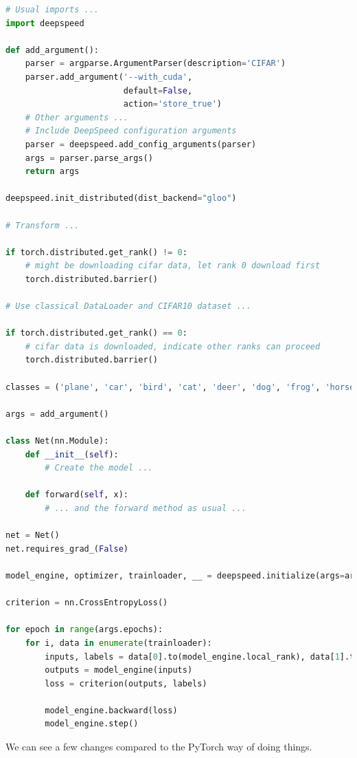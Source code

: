 \documentclass{article}
\begin{document}
\begin{lstlisting}[language=Python]
# Usual imports ...
import deepspeed

def add_argument():
    parser = argparse.ArgumentParser(description='CIFAR')
    parser.add_argument('--with_cuda',
                        default=False,
                        action='store_true')
    # Other arguments ...
    # Include DeepSpeed configuration arguments
    parser = deepspeed.add_config_arguments(parser)
    args = parser.parse_args()
    return args

deepspeed.init_distributed(dist_backend="gloo")

# Transform ...

if torch.distributed.get_rank() != 0:
    # might be downloading cifar data, let rank 0 download first
    torch.distributed.barrier()

# Use classical DataLoader and CIFAR10 dataset ...

if torch.distributed.get_rank() == 0:
    # cifar data is downloaded, indicate other ranks can proceed
    torch.distributed.barrier()

classes = ('plane', 'car', 'bird', 'cat', 'deer', 'dog', 'frog', 'horse', 'ship', 'truck')

args = add_argument()

class Net(nn.Module):
    def __init__(self):
        # Create the model ...

    def forward(self, x):
        # ... and the forward method as usual ...

net = Net()
net.requires_grad_(False)

model_engine, optimizer, trainloader, __ = deepspeed.initialize(args=args, model=net, model_parameters=net.parameters(), training_data=trainset)

criterion = nn.CrossEntropyLoss()

for epoch in range(args.epochs):
    for i, data in enumerate(trainloader):
        inputs, labels = data[0].to(model_engine.local_rank), data[1].to(model_engine.local_rank)
        outputs = model_engine(inputs)
        loss = criterion(outputs, labels)

        model_engine.backward(loss)
        model_engine.step()
\end{lstlisting}
We can see a few changes compared to the PyTorch way of doing things.
\end{document}
